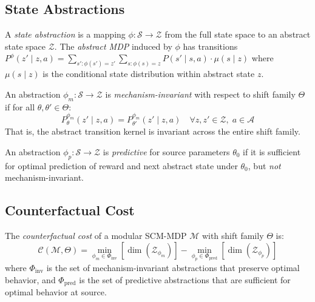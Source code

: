 \documentclass[runningheads]{llncs}
\newcommand{\phim}{\phi_m}
\newcommand{\phip}{\phi_p}
\newcommand{\Scal}{\mathcal{S}}
\newcommand{\Acal}{\mathcal{A}}
\newcommand{\Zcal}{\mathcal{Z}}
\newcommand{\Mcal}{\mathcal{M}}
\begin{document}
\subsection{State Abstractions}

\begin{definition}
\label{def:abstraction}
A \emph{state abstraction} is a mapping $\phi: \Scal \to \Zcal$ from the full state space to an abstract state space $\Zcal$. The \emph{abstract MDP} induced by $\phi$ has transitions $P^\phi(z' \mid z, a) = \sum_{s': \phi(s')=z'} \sum_{s: \phi(s)=z} P(s' \mid s, a) \cdot \mu(s \mid z)$ where $\mu(s \mid z)$ is the conditional state distribution within abstract state $z$.
\end{definition}

\begin{definition}
\label{def:mech-invariant}
An abstraction $\phim: \Scal \to \Zcal$ is \emph{mechanism-invariant} with respect to shift family $\Theta$ if for all $\theta, \theta' \in \Theta$:
\[
P_\theta^{\phim}(z' \mid z, a) = P_{\theta'}^{\phim}(z' \mid z, a) \quad \forall z, z' \in \Zcal, \; a \in \Acal
\]
That is, the abstract transition kernel is invariant across the entire shift family.
\end{definition}

\begin{definition}
\label{def:predictive}
An abstraction $\phip: \Scal \to \Zcal$ is \emph{predictive} for source parameters $\theta_0$ if it is sufficient for optimal prediction of reward and next abstract state under $\theta_0$, but \emph{not} mechanism-invariant.
\end{definition}

\subsection{Counterfactual Cost}

\begin{definition}
\label{def:counterfactual-cost}
The \emph{counterfactual cost} of a modular SCM-MDP $\Mcal$ with shift family $\Theta$ is:
\[
\mathcal{C}(\Mcal, \Theta) = \min_{\phim \in \Phi_{\mathrm{inv}}} \left[ \dim(\Zcal_{\phim}) \right] - \min_{\phip \in \Phi_{\mathrm{pred}}} \left[ \dim(\Zcal_{\phip}) \right]
\]
where $\Phi_{\mathrm{inv}}$ is the set of mechanism-invariant abstractions that preserve optimal behavior, and $\Phi_{\mathrm{pred}}$ is the set of predictive abstractions that are sufficient for optimal behavior at source.
\end{definition}
\end{document}
